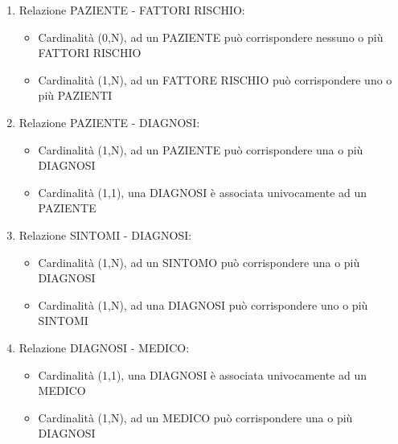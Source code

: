 \documentclass[a4paper,titlepage]{article}
\begin{document}
\begin{enumerate}
\begin{itemize}[leftmargin=0.5cm, topsep=0.25cm, itemsep=0.2cm]
\end{itemize}

\item Relazione PAZIENTE - FATTORI RISCHIO:

\begin{itemize}[leftmargin=0.5cm, topsep=0.25cm, itemsep=0.2cm]

\item Cardinalità (0,N), ad un PAZIENTE può corrispondere nessuno o più FATTORI RISCHIO
\item Cardinalità (1,N), ad un FATTORE RISCHIO può corrispondere uno o più PAZIENTI

\end{itemize}

\item Relazione PAZIENTE - DIAGNOSI:

\begin{itemize}[leftmargin=0.5cm, topsep=0.25cm, itemsep=0.2cm]

\item Cardinalità (1,N), ad un PAZIENTE può corrispondere una o più DIAGNOSI
\item Cardinalità (1,1), una DIAGNOSI è associata univocamente ad un PAZIENTE

\end{itemize}

\item Relazione SINTOMI - DIAGNOSI:

\begin{itemize}[leftmargin=0.5cm, topsep=0.25cm, itemsep=0.2cm]

\item Cardinalità (1,N), ad un SINTOMO può corrispondere una o più DIAGNOSI
\item Cardinalità (1,N), ad una DIAGNOSI può corrispondere uno o più SINTOMI

\end{itemize}

\item Relazione DIAGNOSI - MEDICO:

\begin{itemize}[leftmargin=0.5cm, topsep=0.25cm, itemsep=0.2cm]

\item Cardinalità (1,1), una DIAGNOSI è associata univocamente ad un MEDICO
\item Cardinalità (1,N), ad un MEDICO può corrispondere una o più DIAGNOSI

\end{itemize}


\end{enumerate}
\end{document}
